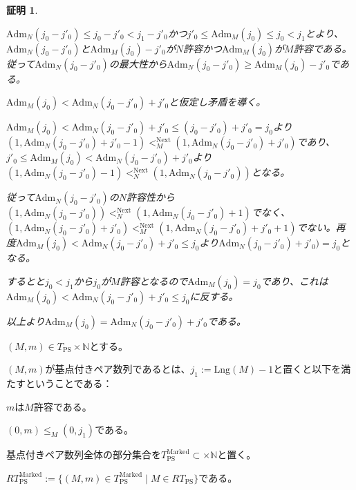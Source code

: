 \documentclass[dvipdfmx,uplatex]{jsarticle}
\theoremstyle{customnonumberbreakfortheorem}
\theoremstyle{customnonumberbreakforproof}
\newtheorem{hideableproof}{証明}
\begin{document}
\begin{hideableproof}
	\begin{indented}
		\item \(\textrm{Adm}_N(j_0-j'_0) \leq j_0-j'_0 < j_1-j'_0\)かつ\(j'_0 \leq \textrm{Adm}_M(j_0) \leq j_0 < j_1\)とより、\(\textrm{Adm}_N(j_0-j'_0)\)と\(\textrm{Adm}_M(j_0)-j'_0\)が\(N\)許容かつ\(\textrm{Adm}_M(j_0)\)が\(M\)許容である。従って\(\textrm{Adm}_N(j_0-j'_0)\)の最大性から\(\textrm{Adm}_N(j_0-j'_0) \geq \textrm{Adm}_M(j_0)-j'_0\)である。
		\item \(\textrm{Adm}_M(j_0) < \textrm{Adm}_N(j_0-j'_0)+j'_0\)と仮定し矛盾を導く。
		\begin{indented}
			\item \(\textrm{Adm}_M(j_0) < \textrm{Adm}_N(j_0-j'_0)+j'_0 \leq (j_0-j'_0)+j'_0 = j_0\)より\((1,\textrm{Adm}_N(j_0-j'_0)+j'_0-1) <_M^{\textrm{Next}} (1,\textrm{Adm}_N(j_0-j'_0)+j'_0)\)であり、\(j'_0 \leq \textrm{Adm}_M(j_0) < \textrm{Adm}_N(j_0-j'_0)+j'_0\)より\((1,\textrm{Adm}_N(j_0-j'_0)-1) <_N^{\textrm{Next}} (1,\textrm{Adm}_N(j_0-j'_0))\)となる。
			\item 従って\(\textrm{Adm}_N(j_0-j'_0)\)の\(N\)許容性から\((1,\textrm{Adm}_N(j_0-j'_0)) <_N^{\textrm{Next}} (1,\textrm{Adm}_N(j_0-j'_0)+1)\)でなく、\((1,\textrm{Adm}_N(j_0-j'_0)+j'_0) <_M^{\textrm{Next}} (1,\textrm{Adm}_N(j_0-j'_0)+j'_0+1)\)でない。再度\(\textrm{Adm}_M(j_0) < \textrm{Adm}_N(j_0-j'_0)+j'_0 \leq j_0\)より\(\textrm{Adm}_N(j_0-j'_0)+j'_0) = j_0\)となる。
			\item するとと\(j_0 < j_1\)から\(j_0\)が\(M\)許容となるので\(\textrm{Adm}_M(j_0) = j_0\)であり、これは\(\textrm{Adm}_M(j_0) < \textrm{Adm}_N(j_0-j'_0)+j'_0 \leq j_0\)に反する。
		\end{indented}
		\item 以上より\(\textrm{Adm}_M(j_0) = \textrm{Adm}_N(j_0-j'_0)+j'_0\)である。
	\end{indented}
\end{hideableproof}

\((M,m) \in T_{\textrm{PS}} \times \mathbb{N}\)とする。
\begin{nenumerate}
	\item \((M,m)\)が基点付きペア数列であるとは、\(j_1 := \textrm{Lng}(M)-1\)と置くと以下を満たすということである：
	\begin{nenumerate}
		\item \(m\)は\(M\)許容である。
		\item \((0,m) \leq_M (0,j_1)\)である。
	\end{nenumerate}
	\item 基点付きペア数列全体の部分集合を\(T_{\textrm{PS}}^{\textrm{Marked}} \subset \times \mathbb{N}\)と置く。
	\item \(RT_{\textrm{PS}}^{\textrm{Marked}} := \{(M,m) \in T_{\textrm{PS}}^{\textrm{Marked}} \mid M \in RT_{\textrm{PS}}\}\)である。
\end{nenumerate}
\end{document}
